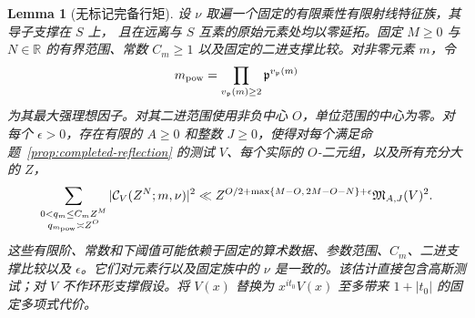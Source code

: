 \documentclass[11pt,a4paper]{article}
\numberwithin{equation}{section}
\numberwithin{figure}{section}
\newtheorem{lemma}[theorem]{Lemma}
\theoremstyle{definition}
\theoremstyle{remark}
\begin{document}
\begin{lemma}[无标记完备行矩]
\label{lem:unmarked-completed-moment}
设 $\nu$ 取遍一个固定的有限乘性有限射线特征族，其导子支撑在 $S$ 上，
且在远离与 $S$ 互素的原始元素处均以零延拓。固定 $M\ge0$ 与 $N\in\mathbb R$
的有界范围、常数 $C_m\ge1$ 以及固定的二进支撑比较。对非零元素 $m$，令
\[
 m_{\rm pow}=\prod_{v_{\mathfrak p}(m)\ge2}
                 \mathfrak p^{v_{\mathfrak p}(m)}
\]
为其最大强理想因子。对其二进范围使用非负中心 $O$，单位范围的中心为零。对每个 $\epsilon>0$，存在有限的 $A\ge0$ 和整数 $J\ge0$，使得对每个满足命题~\ref{prop:completed-reflection} 的测试 $V$、每个实际的 $O$-二元组，以及所有充分大的 $Z$，
\begin{equation}\label{eq:unmarked-completed-moment}
 \sum_{\substack{0<q_m\le C_mZ^M\\q_{m_{\rm pow}}\asymp Z^O}}
       |\mathcal C_V(Z^N;m,\nu)|^2
 \ll Z^{O/2+\max\{M-O,\,2M-O-N\}+\epsilon}
       \mathfrak M_{A,J}(V)^2.
\end{equation}
这些有限阶、常数和下阈值可能依赖于固定的算术数据、参数范围、$C_m$、二进支撑比较以及 $\epsilon$。它们对元素行以及固定族中的 $\nu$ 是一致的。该估计直接包含高斯测试；对 $V$ 不作环形支撑假设。将 $V(x)$ 替换为 $x^{it_0}V(x)$ 至多带来 $1+|t_0|$ 的固定多项式代价。
\end{lemma}
\end{document}
